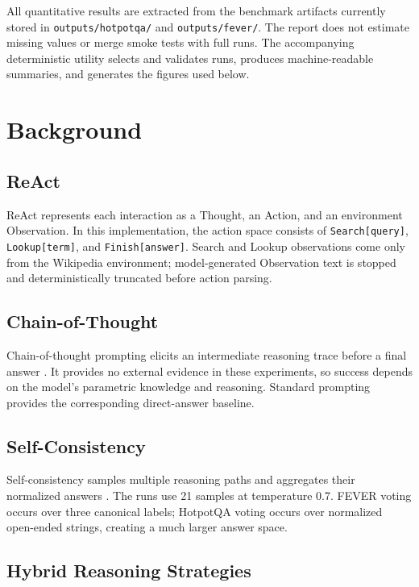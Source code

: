 \documentclass[10pt]{article}
\newcommand{\code}[1]{\texttt{#1}}
\begin{document}
All quantitative results are extracted from the benchmark artifacts currently stored in \code{outputs/hotpotqa/} and \code{outputs/fever/}. The report does not estimate missing values or merge smoke tests with full runs. The accompanying deterministic utility selects and validates runs, produces machine-readable summaries, and generates the figures used below.

\section{Background}

\subsection{ReAct}

ReAct represents each interaction as a Thought, an Action, and an environment Observation. In this implementation, the action space consists of \code{Search[query]}, \code{Lookup[term]}, and \code{Finish[answer]}. Search and Lookup observations come only from the Wikipedia environment; model-generated Observation text is stopped and deterministically truncated before action parsing.

\subsection{Chain-of-Thought}

Chain-of-thought prompting elicits an intermediate reasoning trace before a final answer \cite{wei2022cot}. It provides no external evidence in these experiments, so success depends on the model's parametric knowledge and reasoning. Standard prompting provides the corresponding direct-answer baseline.

\subsection{Self-Consistency}

Self-consistency samples multiple reasoning paths and aggregates their normalized answers \cite{wang2023selfconsistency}. The runs use 21 samples at temperature 0.7. FEVER voting occurs over three canonical labels; HotpotQA voting occurs over normalized open-ended strings, creating a much larger answer space.

\subsection{Hybrid Reasoning Strategies}
\end{document}
